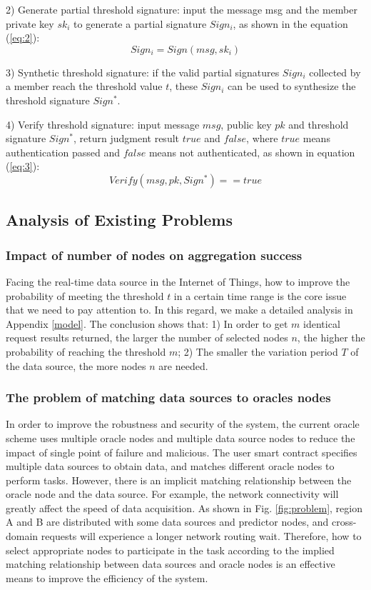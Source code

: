 \documentclass[paper]{ieice}
\begin{document}
2) Generate partial threshold signature: input the message msg and the member private key $sk_i$ to generate a partial signature $Sign_i$, as shown in the equation (\ref{eq:2}):
    \begin{equation}
    \label{eq:2}
        Sign_i = Sign(msg,sk_i)
    \end{equation}

3) Synthetic threshold signature: if the valid partial signatures $Sign_i$ collected by a member reach the threshold value $t$, these $Sign_i$ can be used to synthesize the threshold signature $Sign^*$.

4) Verify threshold signature: input message $msg$, public key $pk$ and threshold signature $Sign^*$, return judgment result $true$ and $false$, where $true$ means authentication passed and $false$ means not authenticated, as shown in equation (\ref{eq:3}):
    \begin{equation}
    \label{eq:3}
        Verify(msg,pk,Sign^*)==true
    \end{equation}

\subsection{Analysis of Existing Problems}

\subsubsection{Impact of number of nodes on aggregation success}
Facing the real-time data source in the Internet of Things, how to improve the probability of meeting the threshold $t$ in a certain time range is the core issue that we need to pay attention to. In this regard, we make a detailed analysis in Appendix \ref{model}. The conclusion shows that: 1) In order to get $m$ identical request results returned, the larger the number of selected nodes $n$, the higher the probability of reaching the threshold $m$; 2) The smaller the variation period $T$ of the data source, the more nodes $n$ are needed.
 
\subsubsection{The problem of matching data sources to oracles nodes}
In order to improve the robustness and security of the system, the current oracle scheme uses multiple oracle nodes and multiple data source nodes to reduce the impact of single point of failure and malicious\cite{gigli2023decentralized}. The user smart contract specifies multiple data sources to obtain data, and matches different oracle nodes to perform tasks. However, there is an implicit matching relationship between the oracle node and the data source. For example, the network connectivity will greatly affect the speed of data acquisition. As shown in Fig. \ref{fig:problem}, region A and B are distributed with some data sources and predictor nodes, and cross-domain requests will experience a longer network routing wait. Therefore, how to select appropriate nodes to participate in the task according to the implied matching relationship between data sources and oracle nodes is an effective means to improve the efficiency of the system.
\end{document}
